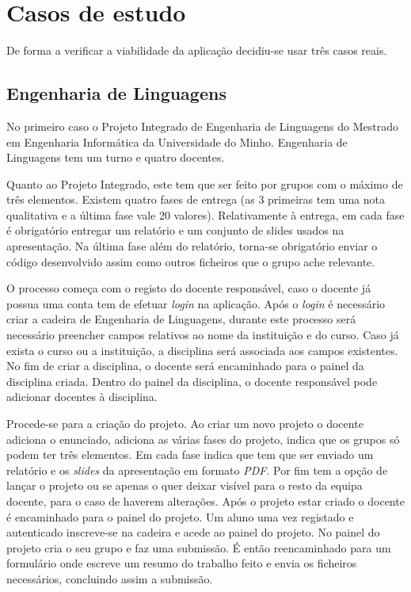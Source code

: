 \section{Casos de estudo}
De forma a verificar a viabilidade da aplicação decidiu-se usar três casos reais.

\subsection{Engenharia de Linguagens} %
\label{sub:engenharia_de_linguagens}


No primeiro caso o Projeto Integrado de Engenharia de Linguagens do Mestrado em Engenharia Informática da Universidade do Minho.
Engenharia de Linguagens tem um turno e quatro docentes.

Quanto ao Projeto Integrado, este tem que ser feito por grupos com o máximo de três elementos. Existem quatro fases de entrega (as 3 primeiras tem uma nota qualitativa e a última fase vale 20 valores). Relativamente à entrega, em cada fase é obrigatório entregar um relatório e um conjunto de slides usados na apresentação. Na última fase além do relatório, torna-se obrigatório enviar o código desenvolvido assim como outros ficheiros que o grupo ache relevante.

O processo começa com o registo do docente responsável, caso o docente já possua uma conta tem de efetuar \emph{login} na aplicação. Após o \emph{login} é necessário criar a cadeira de Engenharia de Linguagens, durante este processo será necessário preencher campos relativos ao nome da instituição e do curso. Caso já  exista o curso ou a instituição, a disciplina será associada aos campos existentes. No fim de criar a disciplina, o docente será encaminhado para o painel da disciplina criada. Dentro do painel da disciplina, o docente responsável pode adicionar docentes à disciplina.

Procede-se para a criação do projeto. Ao criar um novo projeto o docente adiciona o enunciado, adiciona as várias fases do projeto, indica que os grupos só podem ter três elementos. Em cada fase indica que tem que ser enviado um relatório e os \emph{slides} da apresentação em formato \emph{PDF}. Por fim tem a opção de lançar o projeto ou se apenas o quer deixar visível para o resto da equipa docente, para o caso de haverem alterações. Após o projeto estar criado o docente é encaminhado para o painel do projeto.
Um aluno uma vez registado e autenticado inscreve-se na cadeira e acede ao painel do projeto. No painel do projeto cria o seu grupo e faz uma submissão. É então reencaminhado para um formulário onde escreve um resumo do trabalho feito e envia os ficheiros necessários, concluindo assim a submissão.

